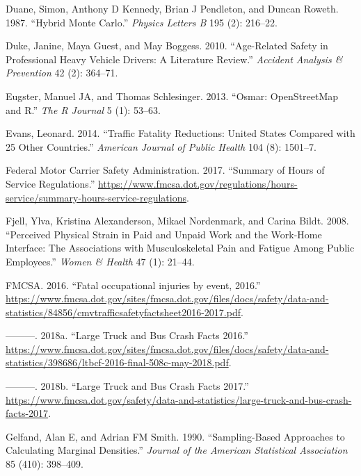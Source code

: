 \documentclass[12pt]{book}
\numberwithin{equation}{chapter}
\begin{document}
\leavevmode\hypertarget{ref-duane1987hybrid}{}%
Duane, Simon, Anthony D Kennedy, Brian J Pendleton, and Duncan Roweth. 1987. ``Hybrid Monte Carlo.'' \emph{Physics Letters B} 195 (2): 216--22.

\leavevmode\hypertarget{ref-duke2010age}{}%
Duke, Janine, Maya Guest, and May Boggess. 2010. ``Age-Related Safety in Professional Heavy Vehicle Drivers: A Literature Review.'' \emph{Accident Analysis \& Prevention} 42 (2): 364--71.

\leavevmode\hypertarget{ref-eugster2013osmar}{}%
Eugster, Manuel JA, and Thomas Schlesinger. 2013. ``Osmar: OpenStreetMap and R.'' \emph{The R Journal} 5 (1): 53--63.

\leavevmode\hypertarget{ref-evans2014traffic}{}%
Evans, Leonard. 2014. ``Traffic Fatality Reductions: United States Compared with 25 Other Countries.'' \emph{American Journal of Public Health} 104 (8): 1501--7.

\leavevmode\hypertarget{ref-hos2017}{}%
Federal Motor Carrier Safety Administration. 2017. ``Summary of Hours of Service Regulations.'' \url{https://www.fmcsa.dot.gov/regulations/hours-service/summary-hours-service-regulations}.

\leavevmode\hypertarget{ref-fjell2008perceived}{}%
Fjell, Ylva, Kristina Alexanderson, Mikael Nordenmark, and Carina Bildt. 2008. ``Perceived Physical Strain in Paid and Unpaid Work and the Work-Home Interface: The Associations with Musculoskeletal Pain and Fatigue Among Public Employees.'' \emph{Women \& Health} 47 (1): 21--44.

\leavevmode\hypertarget{ref-fmcsafacts2016}{}%
FMCSA. 2016. ``Fatal occupational injuries by event, 2016.'' \url{https://www.fmcsa.dot.gov/sites/fmcsa.dot.gov/files/docs/safety/data-and-statistics/84856/cmvtrafficsafetyfactsheet2016-2017.pdf}.

\leavevmode\hypertarget{ref-fmcsareport2016}{}%
---------. 2018a. ``Large Truck and Bus Crash Facts 2016.'' \url{https://www.fmcsa.dot.gov/sites/fmcsa.dot.gov/files/docs/safety/data-and-statistics/398686/ltbcf-2016-final-508c-may-2018.pdf}.

\leavevmode\hypertarget{ref-fmcsareport2017}{}%
---------. 2018b. ``Large Truck and Bus Crash Facts 2017.'' \url{https://www.fmcsa.dot.gov/safety/data-and-statistics/large-truck-and-bus-crash-facts-2017}.

\leavevmode\hypertarget{ref-gelfand1990sampling}{}%
Gelfand, Alan E, and Adrian FM Smith. 1990. ``Sampling-Based Approaches to Calculating Marginal Densities.'' \emph{Journal of the American Statistical Association} 85 (410): 398--409.
\end{document}
